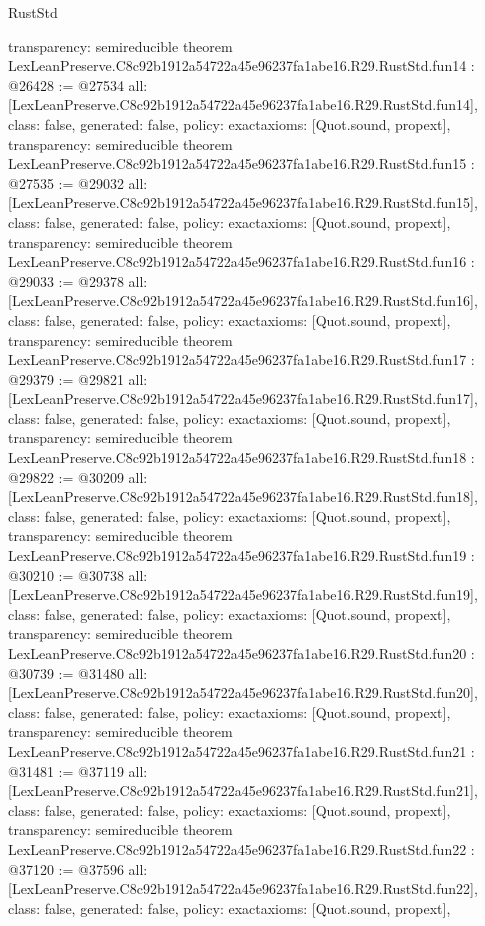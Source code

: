 \begin{lexlean}{RustStd}
\begin{coremodule}
{  transparency: semireducible
}
theorem LexLeanPreserve.C8c92b1912a54722a45e96237fa1abe16.R29.RustStd.fun14 : @26428 := @27534 {
  all: [LexLeanPreserve.C8c92b1912a54722a45e96237fa1abe16.R29.RustStd.fun14],
  class: false,
  generated: false,
  policy: exact{axioms: [Quot.sound, propext]},
  transparency: semireducible
}
theorem LexLeanPreserve.C8c92b1912a54722a45e96237fa1abe16.R29.RustStd.fun15 : @27535 := @29032 {
  all: [LexLeanPreserve.C8c92b1912a54722a45e96237fa1abe16.R29.RustStd.fun15],
  class: false,
  generated: false,
  policy: exact{axioms: [Quot.sound, propext]},
  transparency: semireducible
}
theorem LexLeanPreserve.C8c92b1912a54722a45e96237fa1abe16.R29.RustStd.fun16 : @29033 := @29378 {
  all: [LexLeanPreserve.C8c92b1912a54722a45e96237fa1abe16.R29.RustStd.fun16],
  class: false,
  generated: false,
  policy: exact{axioms: [Quot.sound, propext]},
  transparency: semireducible
}
theorem LexLeanPreserve.C8c92b1912a54722a45e96237fa1abe16.R29.RustStd.fun17 : @29379 := @29821 {
  all: [LexLeanPreserve.C8c92b1912a54722a45e96237fa1abe16.R29.RustStd.fun17],
  class: false,
  generated: false,
  policy: exact{axioms: [Quot.sound, propext]},
  transparency: semireducible
}
theorem LexLeanPreserve.C8c92b1912a54722a45e96237fa1abe16.R29.RustStd.fun18 : @29822 := @30209 {
  all: [LexLeanPreserve.C8c92b1912a54722a45e96237fa1abe16.R29.RustStd.fun18],
  class: false,
  generated: false,
  policy: exact{axioms: [Quot.sound, propext]},
  transparency: semireducible
}
theorem LexLeanPreserve.C8c92b1912a54722a45e96237fa1abe16.R29.RustStd.fun19 : @30210 := @30738 {
  all: [LexLeanPreserve.C8c92b1912a54722a45e96237fa1abe16.R29.RustStd.fun19],
  class: false,
  generated: false,
  policy: exact{axioms: [Quot.sound, propext]},
  transparency: semireducible
}
theorem LexLeanPreserve.C8c92b1912a54722a45e96237fa1abe16.R29.RustStd.fun20 : @30739 := @31480 {
  all: [LexLeanPreserve.C8c92b1912a54722a45e96237fa1abe16.R29.RustStd.fun20],
  class: false,
  generated: false,
  policy: exact{axioms: [Quot.sound, propext]},
  transparency: semireducible
}
theorem LexLeanPreserve.C8c92b1912a54722a45e96237fa1abe16.R29.RustStd.fun21 : @31481 := @37119 {
  all: [LexLeanPreserve.C8c92b1912a54722a45e96237fa1abe16.R29.RustStd.fun21],
  class: false,
  generated: false,
  policy: exact{axioms: [Quot.sound, propext]},
  transparency: semireducible
}
theorem LexLeanPreserve.C8c92b1912a54722a45e96237fa1abe16.R29.RustStd.fun22 : @37120 := @37596 {
  all: [LexLeanPreserve.C8c92b1912a54722a45e96237fa1abe16.R29.RustStd.fun22],
  class: false,
  generated: false,
  policy: exact{axioms: [Quot.sound, propext]},
}
\end{coremodule}
\end{lexlean}
